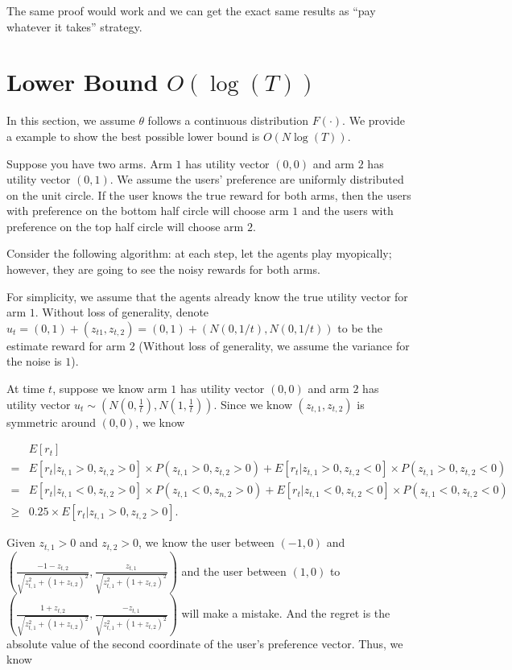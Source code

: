\documentclass{article}
\begin{document}
The same proof would work and we can get the exact same results as ``pay whatever it takes'' strategy. 

\section{Lower Bound $O(\log(T))$}
\label{sec:lb}

In this section, we assume $\theta$ follows a continuous distribution $F(\cdot)$. We provide a example to show the best possible lower bound is $O(N\log(T))$.

Suppose you have two arms. Arm $1$ has utility vector $(0,0)$ and arm $2$ has utility vector $(0,1)$. We assume the users' preference are uniformly distributed on the unit circle. If the user knows the true reward for both arms, then the users with preference on the bottom half circle will choose arm $1$ and the users with preference on the top half circle will choose arm $2$.

Consider the following algorithm: at each step, let the agents play myopically; however, they are going to see the noisy rewards for both arms.

For simplicity, we assume that the agents already know the true utility vector for arm $1$. Without loss of generality, denote $u_{t} = (0,1)+(z_{t1},z_{t,2}) = (0,1)+ (N(0,1/t),N(0,1/t))$ to be the estimate reward for arm $2$ (Without loss of generality, we assume the variance for the noise is $1$). 

At time $t$, suppose we know arm $1$ has utility vector $(0,0)$ and arm $2$ has utility vector $u_t\sim (N(0,\frac{1}{t}), N(1,\frac{1}{t}))$. Since we know $(z_{t,1}, z_{t,2})$ is symmetric around $(0,0)$, we know 

\begin{align}
&E[r_t] \nonumber \\
= &E[r_t | z_{t,1}>0,z_{t,2}>0] \times P(z_{t,1}>0,z_{t,2}>0) + E[r_t |z_{t,1}>0,z_{t,2}<0] \times P(z_{t,1}>0,z_{t,2}<0) \nonumber \\
= &E[r_t | z_{t,1}<0,z_{t,2}>0] \times P(z_{t,1}<0,z_{n,2}>0) + E[r_t |z_{t,1}<0,z_{t,2}<0] \times P(z_{t,1}<0,z_{t,2}<0) \nonumber \\
\geq & 0.25 \times E[r_t | z_{t,1}>0, z_{t,2}>0]. \nonumber
\end{align}

Given $z_{t,1}>0$ and $z_{t,2}>0$, we know the user between $(-1,0)$ and $\left(\frac{-1-z_{t,2}}{\sqrt{z_{t,1}^2+(1+z_{t,2})^2}}, \frac{z_{t,1}}{\sqrt{z_{t,1}^2+(1+z_{t,2})^2}}\right)$ and the user between $(1,0)$ to $\left(\frac{1+z_{t,2}}{\sqrt{z_{t,1}^2+(1+z_{t,2})^2}}, \frac{-z_{t,1}}{\sqrt{z_{t,1}^2+(1+z_{t,2})^2}}\right)$ will make a mistake. And the regret is the absolute value of the second coordinate of the user's preference vector. Thus, we know
\end{document}
